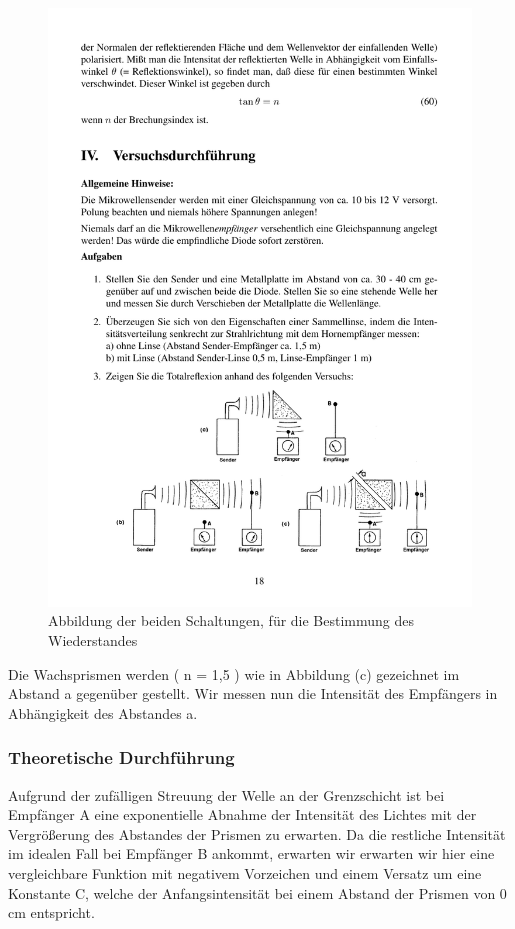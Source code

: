 \documentclass[12pt]{scrartcl}
\begin{document}
\begin{figure}[H] 
  \centering
    \includegraphics[trim = 0mm 15mm 0mm 132mm, clip, scale = 1]{totalreflexion.pdf}
  	\caption[Abbildung der beiden Schaltungen, für die Bestimmung des Wiederstandes]{Abbildung der beiden Schaltungen, für die Bestimmung des Wiederstandes\footnotemark}
  \label{fig:abb_versuch_3}
\end{figure}

Die Wachsprismen werden ( n = 1,5 ) wie in Abbildung (c) gezeichnet im Abstand a gegenüber gestellt. Wir messen nun die Intensität des Empfängers in Abhängigkeit des Abstandes a.
\subsubsection{Theoretische Durchführung}
Aufgrund der zufälligen Streuung der Welle an der Grenzschicht ist bei Empfänger A eine exponentielle Abnahme der Intensität des Lichtes mit der Vergrößerung des Abstandes der Prismen zu erwarten. Da die restliche Intensität im idealen Fall bei Empfänger B ankommt, erwarten wir erwarten wir hier eine vergleichbare Funktion mit negativem Vorzeichen und einem Versatz um eine Konstante C, welche der Anfangsintensität bei einem Abstand der Prismen von 0 cm entspricht.
\end{document}
